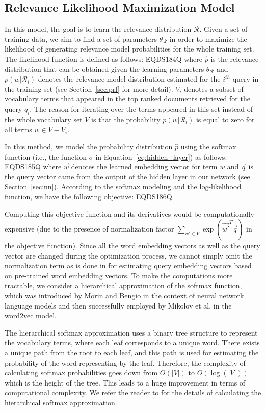 \documentclass[sigconf]{acmart}
\begin{document}
\subsection{Relevance Likelihood Maximization Model}
\label{sec:model1}
In this model, the goal is to learn the relevance distribution $\mathcal{R}$. Given a set of training data, we aim to find a set of parameters $\theta_\mathcal{R}$ in order to maximize the likelihood of generating relevance model probabilities for the whole training set. The likelihood function is defined as follows:
EQDS184Q
where $\widehat{p}$ is the relevance distribution that can be obtained given the learning parameters $\theta_\mathcal{R}$ and $p(w | \mathcal{R}_i)$ denotes the relevance model distribution estimated for the $i^{th}$ query in the training set (see Section~\ref{sec:prf} for more detail). $V_i$ denotes a subset of vocabulary terms that appeared in the top ranked documents retrieved for the query $q_i$. The reason for iterating over the terms appeared in this set instead of the whole vocabulary set $V$ is that the probability $p(w | \mathcal{R}_i)$  is equal to zero for all terms $w \in V-V_i$.

In this method, we model the probability distribution $\widehat{p}$ using the softmax function (i.e., the function $\sigma$ in {Equation}~\eqref{eq:hidden_layer}) as follows:
EQDS185Q
where $\vec{w}$ denotes the learned embedding vector for term $w$ and $\vec{q}$ is the query vector came from the output of the hidden layer in our network (see Section~\ref{sec:nn}). According to the softmax modeling and the log-likelihood function, we have the following objective:
EQDS186Q

Computing this objective function and its derivatives would be computationally expensive (due to the presence of normalization factor $\sum_{w' \in V}{\exp{(\vec{w'}^T \vec{q})}}$ in the objective function). Since all the word embedding vectors as well as the query vector are changed during the optimization process, we cannot simply omit the normalization term as is done in \cite{Zamani:2016:ICTIR:pqv} for estimating query embedding vectors based on pre-trained word embedding vectors. To make the computations more tractable, we consider a hierarchical approximation of the softmax function, which was introduced by Morin and Bengio \cite{Morin:2005} in the context of neural network language models and then successfully employed by Mikolov et al. \cite{Mikolov:2013} in the word2vec model.

The hierarchical softmax approximation uses a binary tree structure to represent the vocabulary terms, where each leaf corresponds to a unique word. There exists a unique path from the root to each leaf, and this path is used for estimating the probability of the word representing by the leaf. Therefore, the complexity of calculating softmax probabilities goes down from $O(|V|)$ to $O(\log(|V|))$ which is the height of the tree. This leads to a huge improvement in terms of computational complexity. We refer the reader to \cite{Morin:2005,Minh:2009} for the details of calculating the hierarchical softmax approximation.
\end{document}
